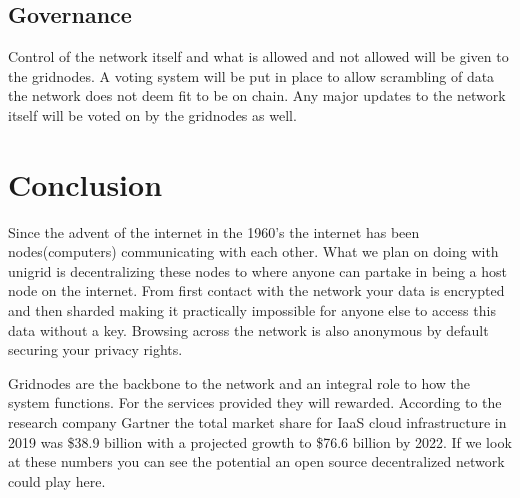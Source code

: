 \documentclass[12pt]{article}
\begin{document}
\subsection*{Governance}
Control of the network itself and what is allowed and not allowed will be given to the gridnodes. A voting system will be put in place to allow scrambling of data the network does not deem fit to be on chain. Any major updates to the network itself will be voted on by the gridnodes as well.


\section*{Conclusion}

Since the advent of the internet in the 1960's\cite{int1997} the internet has been nodes(computers) communicating with each other. What we plan on doing with unigrid is decentralizing these nodes to where anyone can partake in being a host node on the internet. From first contact with the network your data is encrypted and then sharded making it practically impossible for anyone else to access this data without a key. Browsing across the network is also anonymous by default securing your privacy rights. 

Gridnodes are the backbone to the network and an integral role to how the system functions. For the services provided they will rewarded. According to the research company Gartner the total market share for IaaS cloud infrastructure in 2019 was \$38.9 billion with a projected growth to \$76.6 billion by 2022\cite{gartner2019}. If we look at these numbers you can see the potential an open source decentralized network could play here.
\end{document}

